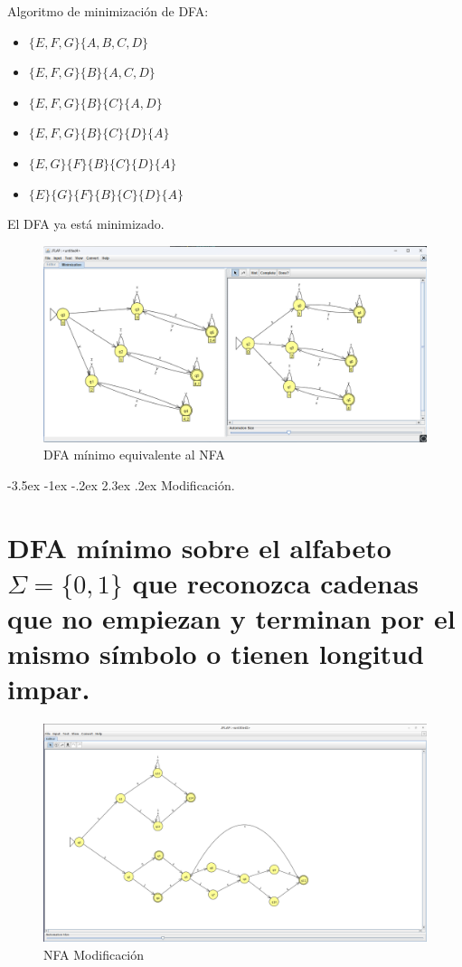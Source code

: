 \documentclass[11pt]{report}
\makeatletter
\renewcommand\chapter{\@startsection{chapter}{0}{\z@}%
    {-3.5ex \@plus -1ex \@minus -.2ex}%
    {2.3ex \@plus.2ex}%
    {\normalfont\Large\bfseries}}
\makeatother
\begin{document}
\newpage

Algoritmo de minimización de DFA:
\begin{itemize}
  \item $\{E, F, G\} \{A, B, C, D\}$
  \item $\{E, F, G\} \{B\} \{A, C, D\}$
  \item $\{E, F, G\} \{B\} \{C\} \{A, D\}$
  \item $\{E, F, G\} \{B\} \{C\} \{D\} \{A\}$
  \item $\{E, G\} \{F\} \{B\} \{C\} \{D\} \{A\}$
  \item $\{E\} \{G\} \{F\} \{B\} \{C\} \{D\} \{A\}$
\end{itemize}

El DFA ya está minimizado.
\begin{figure}[H]
  \centering
  \includegraphics[scale=0.45]{img/DFA_to_DFA_minimized_07.png}
  \caption{DFA mínimo equivalente al NFA}
\end{figure}

\newpage

\chapter{Modificación.}
\section{DFA mínimo sobre el alfabeto $\Sigma = \{0, 1\}$ que reconozca cadenas que no empiezan y terminan por el mismo símbolo o tienen longitud impar.}

\begin{figure}[H]
  \centering
  \includegraphics[scale=0.2]{img/nfa_mod.png}
  \caption{NFA Modificación}
\end{figure}
\end{document}
